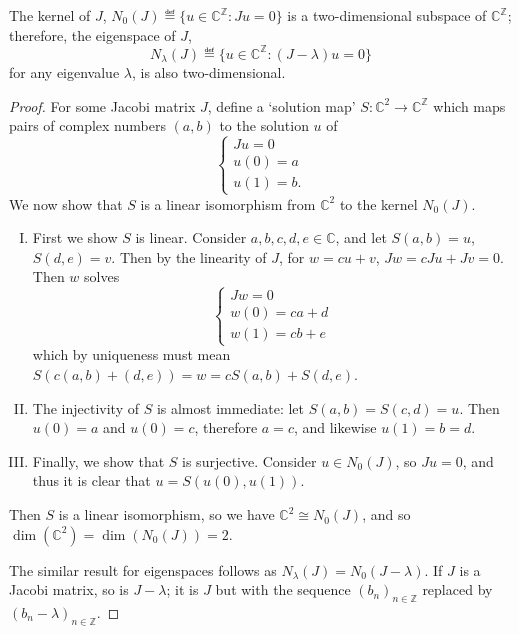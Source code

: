 \documentclass[../main.tex]{subfiles}
\begin{document}
\begin{proposition}
\label{thm:2efde-ker-dim}
  The kernel of $J$, $N_0(J) \eqdef \{u \in \mathbb{C}^\mathbb{Z} : Ju = 0\}$
  is a two-dimensional subspace of $\mathbb{C}^\mathbb{Z}$;
  therefore, the eigenspace of $J$, 
$$N_\lambda(J) \eqdef \{u \in \mathbb{C}^\mathbb{Z} : (J - \lambda)u = 0\}$$
for any eigenvalue $\lambda$, is also two-dimensional.
\end{proposition}
\begin{proof}
For some Jacobi matrix $J$, define a `solution map' 
$S: \mathbb{C}^2 \rightarrow \mathbb{C}^\mathbb{Z}$ which maps pairs of
complex numbers $(a, b)$ to the solution $u$ of 
  $$
  \begin{cases} 
    Ju = 0\\
    u(0) = a\\ u(1) = b.
  \end{cases}
  $$
We now show that $S$ is a linear
isomorphism from $\mathbb{C}^2$ to the kernel $N_0 (J)$.
\begin{enumerate}[I.]
\item First we show $S$ is linear. Consider $a, b, c, d, e \in
\mathbb{C}$, and let $S(a, b) = u$, $S(d, e) = v$. Then by the
linearity of $J$, for $w = cu + v$, $Jw = cJu + Jv = 0$. Then
$w$ solves
  $$ 
  \begin{cases}
    Jw = 0\\
    w(0) = ca + d\\
    w(1) = cb + e 
  \end{cases}
  $$
which by uniqueness must mean $S(c(a, b) + (d, e)) = w = cS(a, b) + S(d, e)$.

\item The injectivity of $S$ is almost immediate: let $S(a, b) = S(c, d) = u$.
Then $u(0) = a$ and $u(0) = c$, therefore $a = c$, and likewise $u(1) = b = d$.

\item Finally, we show that $S$ is surjective. Consider $u \in N_0 (J)$, so $Ju
= 0$, and thus it is clear that $u = S(u(0), u(1)).$ \end{enumerate} Then $S$ is
a linear isomorphism, so we have $\mathbb{C}^2 \cong N_0 (J)$, and so
$\dim(\mathbb{C}^2) = \dim(N_0 (J)) = 2$.

The similar result for eigenspaces follows as
$N_\lambda (J) = N_0 (J - \lambda)$. If $J$ is a Jacobi matrix, so is $J - \lambda$;
it is $J$ but with the sequence $(b_n)_{n \in \mathbb{Z}}$ replaced by $(b_n - \lambda)_{n \in
\mathbb{Z}}$. 
\end{proof}
\end{document}
